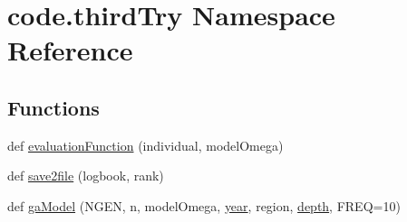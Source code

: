 \hypertarget{namespacecode_1_1third_try}{}\section{code.\+third\+Try Namespace Reference}
\label{namespacecode_1_1third_try}
\subsection*{Functions}
\begin{DoxyCompactItemize}
\item 
def \hyperlink{namespacecode_1_1third_try_a3d84fdf17250c9c0b1547c5c545f6c5b}{evaluation\+Function} (individual, model\+Omega)
\item 
def \hyperlink{namespacecode_1_1third_try_aa9164c597206c52dca18c340eba9f33f}{save2file} (logbook, rank)
\item 
def \hyperlink{namespacecode_1_1third_try_af5f0d516268ea4b8717680aff6e9f789}{ga\+Model} (N\+G\+EN, n, model\+Omega, \hyperlink{namespacecode_1_1third_try_a940c1383be044c2ae5f6e40411f9b0b4}{year}, region, \hyperlink{namespacecode_1_1third_try_a8ef5d016b8d3671a31729ee874cf3ecc}{depth}, F\+R\+EQ=10)
\end{DoxyCompactItemize}
